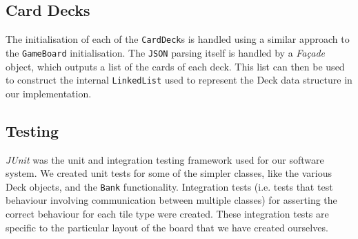 \documentclass[a4paper, 11pt]{article}
\begin{document}
	\subsection*{Card Decks}
	The initialisation of each of the \texttt{CardDeck}s is handled using a similar approach to the \texttt{GameBoard} initialisation. The \texttt{JSON} parsing itself is handled by a \textit{Fa\c{c}ade} object, which outputs a list of the cards of each deck. This list can then be used to construct the internal \texttt{LinkedList} used to represent the Deck data structure in our implementation.
	
	\subsection*{Testing}
	\textit{JUnit} was the unit and integration testing framework used for our software system. We created unit tests for some of the simpler classes, like the various Deck objects, and the \texttt{Bank} functionality.
	Integration tests (i.e. tests that test behaviour involving communication between multiple classes) for asserting the correct behaviour for each tile type were created. These integration tests are specific to the particular layout of the board that we have created ourselves.
	
	
\end{document}
